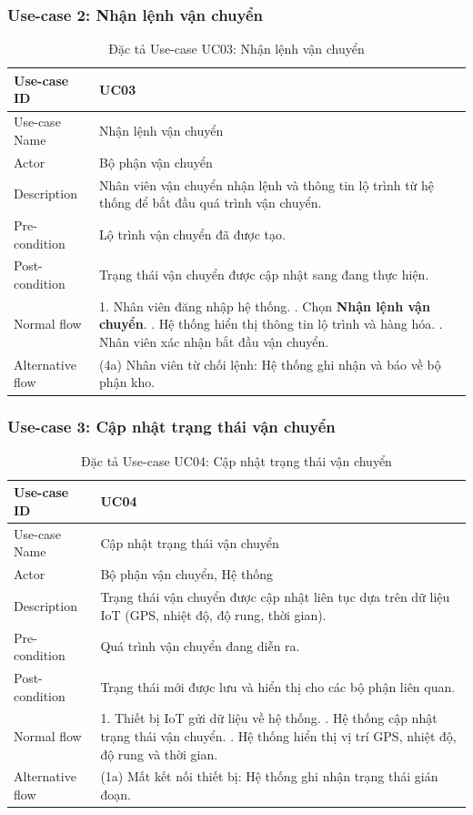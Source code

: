 \subsubsection{Use-case 2: Nhận lệnh vận chuyển}
\begin{table}[H]
\centering
\begin{tabularx}{\textwidth}{|l|X|}
\hline
Use-case ID & UC03 \\ \hline
Use-case Name & Nhận lệnh vận chuyển \\ \hline
Actor & Bộ phận vận chuyển \\ \hline
Description & Nhân viên vận chuyển nhận lệnh và thông tin lộ trình từ hệ thống để bắt đầu quá trình vận chuyển. \\ \hline
Pre-condition & Lộ trình vận chuyển đã được tạo. \\ \hline
Post-condition & Trạng thái vận chuyển được cập nhật sang đang thực hiện. \\ \hline
Normal flow &
1. Nhân viên đăng nhập hệ thống. \newline
2. Chọn \textbf{Nhận lệnh vận chuyển}. \newline
3. Hệ thống hiển thị thông tin lộ trình và hàng hóa. \newline
4. Nhân viên xác nhận bắt đầu vận chuyển. \\ \hline
Alternative flow &
(4a) Nhân viên từ chối lệnh: Hệ thống ghi nhận và báo về bộ phận kho. \\ \hline
\end{tabularx}
\caption{Đặc tả Use-case UC03: Nhận lệnh vận chuyển}
\end{table}

\subsubsection{Use-case 3: Cập nhật trạng thái vận chuyển}
\begin{table}[H]
\centering
\begin{tabularx}{\textwidth}{|l|X|}
\hline
Use-case ID & UC04 \\ \hline
Use-case Name & Cập nhật trạng thái vận chuyển \\ \hline
Actor & Bộ phận vận chuyển, Hệ thống \\ \hline
Description & Trạng thái vận chuyển được cập nhật liên tục dựa trên dữ liệu IoT (GPS, nhiệt độ, độ rung, thời gian). \\ \hline
Pre-condition & Quá trình vận chuyển đang diễn ra. \\ \hline
Post-condition & Trạng thái mới được lưu và hiển thị cho các bộ phận liên quan. \\ \hline
Normal flow &
1. Thiết bị IoT gửi dữ liệu về hệ thống. \newline
2. Hệ thống cập nhật trạng thái vận chuyển. \newline
3. Hệ thống hiển thị vị trí GPS, nhiệt độ, độ rung và thời gian. \\ \hline
Alternative flow &
(1a) Mất kết nối thiết bị: Hệ thống ghi nhận trạng thái gián đoạn. \\ \hline
\end{tabularx}
\caption{Đặc tả Use-case UC04: Cập nhật trạng thái vận chuyển}
\end{table}

